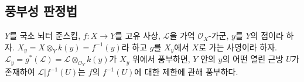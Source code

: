 
\subsection{풍부성 판정법}

\begin{theorem}[4.7.1]
\label{III.4.7.1-fr}
$Y$를 국소 뇌터 준스킴, $f:X\to Y$를 고유 사상,
$\mathcal L$을 가역 $\mathcal O_X$-가군, $y$를 $Y$의 점이라 하자.
$X_y=X\otimes_Yk(y)=f^{-1}(y)$라 하고 $g$를 $X_y$에서 $X$로 가는
사영이라 하자. $\mathcal L_y=g^*(\mathcal L)
=\mathcal L\otimes_{\mathcal O_Y}k(y)$가 $X_y$ 위에서 풍부하면,
$Y$ 안의 $y$의 어떤 열린 근방 $U$가 존재하여
$\mathcal L|f^{-1}(U)$는 $f$의 $f^{-1}(U)$에 대한 제한에 관해
풍부하다.
\end{theorem}

